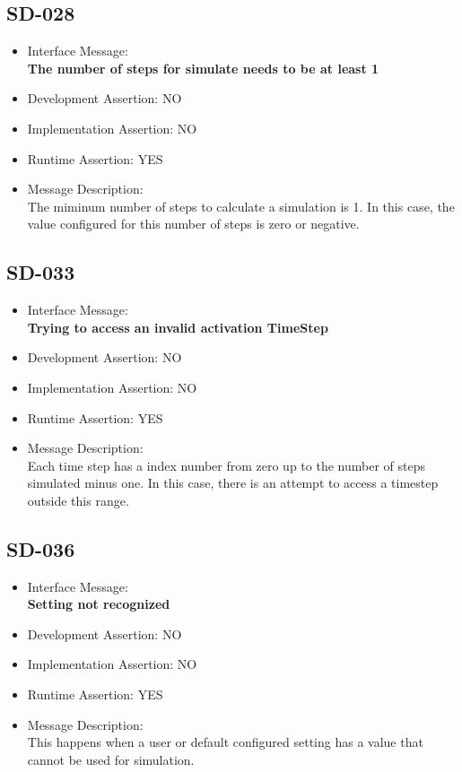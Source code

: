 \subsection{SD-028}
\begin{itemize}
  \item Interface Message:\\[1em]
    \textbf{The number of steps for simulate needs to be at least 1}
  \item Development Assertion: NO
  \item Implementation Assertion: NO
  \item Runtime Assertion: YES
  \item Message Description:\\[1em]
    The miminum number of steps to calculate a simulation is 1. In this case, the value configured for this number of steps is zero or negative.
\end{itemize}

\subsection{SD-033}
\begin{itemize}
  \item Interface Message:\\[1em]
    \textbf{Trying to access an invalid activation TimeStep}
  \item Development Assertion: NO
  \item Implementation Assertion: NO
  \item Runtime Assertion: YES
  \item Message Description:\\[1em]
    Each time step has a index number from zero up to the number of steps simulated minus one. In this case, there is an attempt to access a timestep outside this range.
\end{itemize}

\subsection{SD-036}
\begin{itemize}
  \item Interface Message:\\[1em]
    \textbf{Setting not recognized}
  \item Development Assertion: NO
  \item Implementation Assertion: NO
  \item Runtime Assertion: YES
  \item Message Description:\\[1em]
    This happens when a user or default configured setting has a value that cannot be used for simulation.
\end{itemize}

